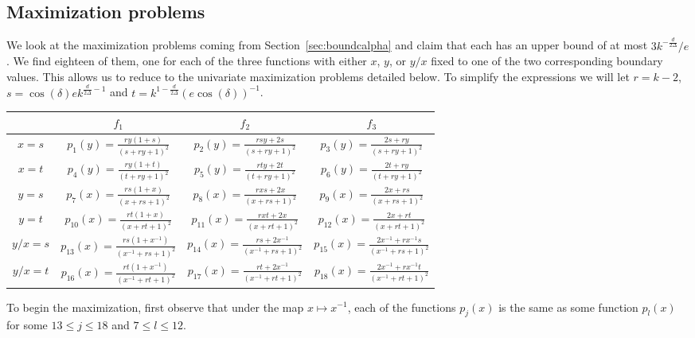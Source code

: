 \subsection{Maximization problems}
\label{app:zfr}
We look at the maximization problems coming from Section~\ref{sec:boundcalpha} and claim that each has an upper bound of at most $3 k^{-\frac{d}{2\Delta}}/e$.
We find eighteen of them, one for each of the three functions with either $x$, $y$, or $y/x$ fixed to one of the two corresponding boundary values.
This allows us to reduce to the univariate maximization problems detailed below.
To simplify the expressions we will let $r=k-2 $, $s = \cos(\delta)e k^{\frac{d}{2\Delta}-1}$ and $t=k^{1-\frac{d}{2\Delta}}(e\cos(\delta))^{-1}$.
%
\begin{center}
\begin{tabular}{ |c|c|c|c| }
\hline
& $f_1$ & $f_2$ & $f_3$ \\ \hline
  $x = s$ 
  & $p_1(y) =\frac{ry(1+s)}{(s+ry+1)^2}$
  & $p_2(y) = \frac{rsy+2s}{(s+ry+1)^2}$
  & $p_3(y) = \frac{2s+ry}{(s+ry+1)^2}$
  \\ \hline
  
  $x = t$ 
  & $p_4(y) = \frac{ry(1+t)}{(t+ry+1)^2}$ 
  & $p_5(y) = \frac{rty+2t}{(t+ry+1)^2}$
  & $p_6(y) = \frac{2t+ry}{(t+ry+1)^2}$
  \\ \hline
  
  $y = s$ 
  & $p_7(x) = \frac{rs(1+x)}{(x+rs+1)^2}$ 
  & $p_8(x) = \frac{rxs+2x}{(x+rs+1)^2}$
  & $p_9(x) = \frac{2x+rs}{(x+rs+1)^2}$
  \\ \hline
  
  $y = t$ 
  & $p_{10}(x) = \frac{rt(1+x)}{(x+rt+1)^2}$ 
  & $p_{11}(x) = \frac{rxt+2x}{(x+rt+1)^2}$
  & $p_{12}(x) = \frac{2x+rt}{(x+rt+1)^2}$
  \\ \hline
  
  $y/x = s$ 
  & $p_{13}(x) = \frac{rs(1+x^{-1})}{(x^{-1}+rs+1)^2}$ 
  & $p_{14}(x) = \frac{rs+2x^{-1}}{(x^{-1}+rs+1)^2}$ 
  & $p_{15}(x) = \frac{2x^{-1}+rx^{-1}s}{(x^{-1}+rs+1)^2}$ 
  \\ \hline
  
  $y/x = t$ 
  & $p_{16}(x) = \frac{rt(1+x^{-1})}{(x^{-1}+rt+1)^2}$ 
  & $p_{17}(x) = \frac{rt+2x^{-1}}{(x^{-1}+rt+1)^2}$ 
  & $p_{18}(x) = \frac{2x^{-1}+rx^{-1}t}{(x^{-1}+rt+1)^2}$  
  \\ \hline
\end{tabular}
\end{center}
%
To begin the maximization, first observe that under the map $x \mapsto x^{-1}$, each of the functions $p_j(x)$ is the same as some function $p_l(x)$ for some $13 \leq j \leq 18$ and $7 \leq l \leq 12$.
